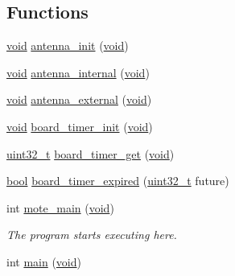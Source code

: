 \subsection*{Functions}
\begin{DoxyCompactItemize}
\item 
\hyperlink{usb__devapi_8h_afabf60e7f57651d6d595a02c75f07cd0}{void} \hyperlink{_open_mote-_c_c2538_2board_8c_a69f1b944e439c245a9909f3c8e9e2837}{antenna\+\_\+init} (\hyperlink{usb__devapi_8h_afabf60e7f57651d6d595a02c75f07cd0}{void})
\item 
\hyperlink{usb__devapi_8h_afabf60e7f57651d6d595a02c75f07cd0}{void} \hyperlink{_open_mote-_c_c2538_2board_8c_a086cf02844ade3768ae250a9fc74b3fe}{antenna\+\_\+internal} (\hyperlink{usb__devapi_8h_afabf60e7f57651d6d595a02c75f07cd0}{void})
\item 
\hyperlink{usb__devapi_8h_afabf60e7f57651d6d595a02c75f07cd0}{void} \hyperlink{_open_mote-_c_c2538_2board_8c_ae28280d8705fceeb722c55991aee6e99}{antenna\+\_\+external} (\hyperlink{usb__devapi_8h_afabf60e7f57651d6d595a02c75f07cd0}{void})
\item 
\hyperlink{usb__devapi_8h_afabf60e7f57651d6d595a02c75f07cd0}{void} \hyperlink{_open_mote-_c_c2538_2board_8c_a1086b4b191966b7ce146d45d22274101}{board\+\_\+timer\+\_\+init} (\hyperlink{usb__devapi_8h_afabf60e7f57651d6d595a02c75f07cd0}{void})
\item 
\hyperlink{_p_e___types_8h_a33594304e786b158f3fb30289278f5af}{uint32\+\_\+t} \hyperlink{_open_mote-_c_c2538_2board_8c_a1409dd4554f2fa814490c8d500eb4236}{board\+\_\+timer\+\_\+get} (\hyperlink{usb__devapi_8h_afabf60e7f57651d6d595a02c75f07cd0}{void})
\item 
\hyperlink{_p_e___types_8h_a97a80ca1602ebf2303258971a2c938e2}{bool} \hyperlink{_open_mote-_c_c2538_2board_8c_a7c18a2cb1673d859694a0b42bb7378b5}{board\+\_\+timer\+\_\+expired} (\hyperlink{_p_e___types_8h_a33594304e786b158f3fb30289278f5af}{uint32\+\_\+t} future)
\item 
int \hyperlink{_open_mote-_c_c2538_2board_8c_ad0caa506af897a3ebe6699aa0c0da367}{mote\+\_\+main} (\hyperlink{usb__devapi_8h_afabf60e7f57651d6d595a02c75f07cd0}{void})
\begin{DoxyCompactList}\small\item\em The program starts executing here. \end{DoxyCompactList}\item 
int \hyperlink{_open_mote-_c_c2538_2board_8c_a840291bc02cba5474a4cb46a9b9566fe}{main} (\hyperlink{usb__devapi_8h_afabf60e7f57651d6d595a02c75f07cd0}{void})

\end{DoxyCompactItemize}

